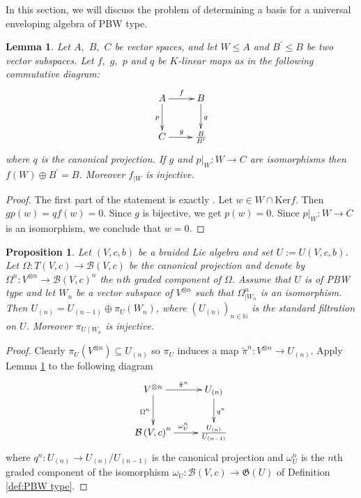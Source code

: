 \documentclass[english]{amsart}
\numberwithin{equation}{section}
\numberwithin{figure}{section}
\theoremstyle{plain}
\theoremstyle{definition}
\theoremstyle{definition}
\theoremstyle{remark}
\theoremstyle{remark}
\theoremstyle{plain}
\newtheorem{lem}[thm]{Lemma}
\theoremstyle{plain}
\newtheorem{prop}[thm]{Proposition}
\theoremstyle{plain}
\begin{document}
In this section, we will discuss the problem of determining a basis
for a universal enveloping algebra of PBW type.
\begin{lem}
\label{lem:Dragos} Let $A,$ $B,$ $C$ be vector spaces, and let
$W\leq A$ and $B^{\prime}\leq B$ be two vector subspaces. Let $f,$
$g,$ $p$ and $q$ be $K$-linear maps as in the following commutative
diagram: \[
\xymatrix{A\ar[d]_{p}\ar[r]^{f} & B\ar[d]^{q}\\
C\ar[r]^{g} & \frac{B}{B^{\prime}}}
\]
 where $q$ is the canonical projection. If $g$ and $p|_{W}:W\rightarrow C$
are isomorphisms then $f(W)\oplus B^{\prime}=B$. Moreover $f_{\mid W}$
is injective.\end{lem}
\begin{proof}
The first part of the statement is exactly \cite[Lemma 4.21]{AMS-MM}.
Let $w\in W\cap\mathrm{Ker}f$. Then $gp\left(w\right)=qf\left(w\right)=0$.
Since $g$ is bijective, we get $p\left(w\right)=0$. Since $p|_{W}:W\rightarrow C$
is an isomorphism, we conclude that $w=0$.\end{proof}
\begin{prop}
\label{pro:PBWbasis}Let $\left(V,c,b\right)$ be a braided Lie algebra
and set $U:=U(V,c,b)$. Let $\Omega:T\left(V,c\right)\rightarrow\mathcal{B}\left(V,c\right)$
be the canonical projection and denote by $\Omega^{n}:V^{\otimes n}\rightarrow\mathcal{B}\left(V,c\right)^{n}$
the $n$th graded component of $\Omega$. Assume that $U$ is of PBW
type and let $W_{n}$ be a vector subspace of $V^{\otimes n}$ such
that $\Omega_{\mid W_{n}}^{n}$ is an isomorphism. Then $U_{\left(n\right)}=U_{\left(n-1\right)}\oplus\pi_{U}\left(W_{n}\right)$, where $\left(U_{\left(n\right)}\right)_{n\in\mathbb{N}}$ is the
standard filtration on $U$. Moreover $\pi_{U\mid W_{n}}$
is injective.\end{prop}
\begin{proof}
Clearly $\pi_{U}\left(V^{\otimes n}\right)\subseteq U_{\left(n\right)}$
so $\pi_{U}$ induces a map $\tilde{\pi}^{n}:V^{\otimes n}\rightarrow U_{\left(n\right)}$.
Apply Lemma \ref{lem:Dragos} to the following diagram \[
\xymatrix{V^{\otimes n}\ar[d]_{\Omega^{n}}\ar[r]^{\tilde{\pi}^{n}} & U_{\left(n\right)}\ar[d]^{q^{n}}\\
\mathcal{B}\left(V,c\right)^{n}\ar[r]^{\omega_{U}^{n}} & \frac{U_{\left(n\right)}}{U_{\left(n-1\right)}}}
\]
where $q^{n}:U_{\left(n\right)}\rightarrow U_{\left(n\right)}/U_{\left(n-1\right)}$
is the canonical projection and $\omega_{U}^{n}$ is the $n$th graded
component of the isomorphism $\omega_{U}:\mathcal{B}\left(V,c\right)\rightarrow\mathfrak{G}\left(U\right)$
of Definition \ref{def:PBW type}.\end{proof}
\end{document}
